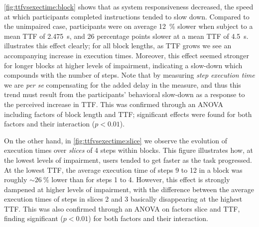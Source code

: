 \cref{fig:ttfvsexectime:block} shows that as system responsiveness decreased, the speed at which participants completed instructions tended to slow down.
Compared to the unimpaired case, participants were on average \SI{12}{\percent} slower when subject to a mean \gls{TTF} of \SI{2.475}{\second}, and \num{26} percentage points slower at a mean \gls{TTF} of \SI{4.5}{\second}.
 illustrates this effect clearly;
for all block lengths, as \gls{TTF} grows we see an accompanying increase in execution times.
Moreover, this effect seemed stronger for longer blocks at higher levels of impairment, indicating a slow-down which compounds with the number of steps.
Note that by measuring \emph{step execution time} we are \emph{per se} compensating for the added delay in the measure, and thus this trend must result from the participants' behavioral slow-down as a response to the perceived increase in \gls{TTF}.
This was confirmed through an \gls{ANOVA}~\cite{fujikoshi1993two} including factors of block length and \gls{TTF}; significant effects were found for both factors and their interaction (\ensuremath{p < 0.01}).

On the other hand, in \cref{fig:ttfvsexectime:slice} we observe the evolution of execution times over \emph{slices} of \num{4} steps within blocks.
This figure illustrates how, at the lowest levels of impairment, users tended to get faster as the task progressed.
At the lowest \gls{TTF}, the average execution time of steps \num{9} to \num{12} in a block was roughly \ensuremath{\sim\SI{26}{\percent}} lower than for steps \num{1} to \num{4}.
However, this effect is strongly dampened at higher levels of impairment, with the difference between the average execution times of steps in slices \num{2} and \num{3} basically disappearing at the highest \gls{TTF}.
This was also confirmed through an \gls{ANOVA} on factors slice and \gls{TTF}, finding significant (\ensuremath{p < 0.01}) for both factors and their interaction.

